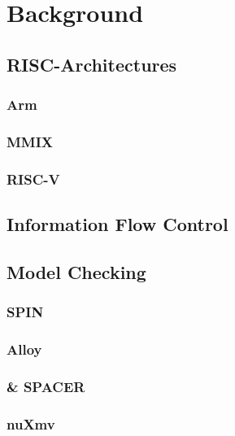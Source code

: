 \section{Background}

\subsection{RISC-Architectures}

\subsubsection{Arm}

\subsubsection{MMIX}

\subsubsection{RISC-V}

\subsection{Information Flow Control}

\subsection{Model Checking}

\subsubsection{SPIN}

\subsubsection{Alloy}

\subsubsection{\muZ \& SPACER}

\subsubsection{nuXmv}
